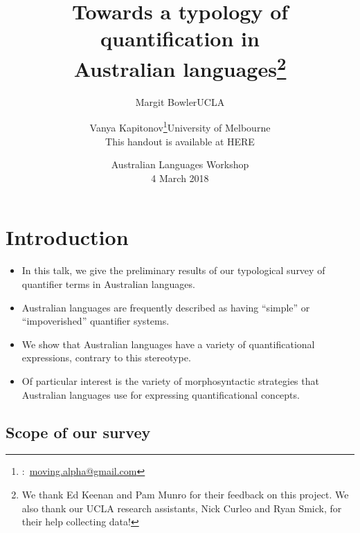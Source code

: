 \documentclass{article}
\title{Towards a typology of quantification in\\ Australian languages\thanks{We thank Ed Keenan and Pam Munro for their feedback on this project. We also thank our UCLA research assistants, Nick Curleo and Ryan Smick, for their help collecting data!}}
\author{Margit Bowler\authorcr UCLA \and \vspace{-.5cm}Vanya Kapitonov\thanks{\Letter:~\href{mailto:moving.alpha@gmail.com}{moving.alpha@gmail.com}}\authorcr University of Melbourne\\ This handout is available at HERE} %
\date{Australian Languages Workshop\\4 March 2018}
\begin{document}
\maketitle


\section[Introduction]{Introduction}
\begin{itemize}
    \item In this talk, we give the preliminary results of our typological survey of quantifier terms in Australian languages.
    \item Australian languages are  frequently described as having ``simple'' or ``impoverished'' quantifier systems.%
    \item We show that Australian languages have a variety of quantificational expressions, contrary to this stereotype.
    \item Of particular interest is the variety of morphosyntactic strategies that Australian languages use for expressing quantificational concepts.
\end{itemize}

\subsection{Scope of our survey}
\end{document}
